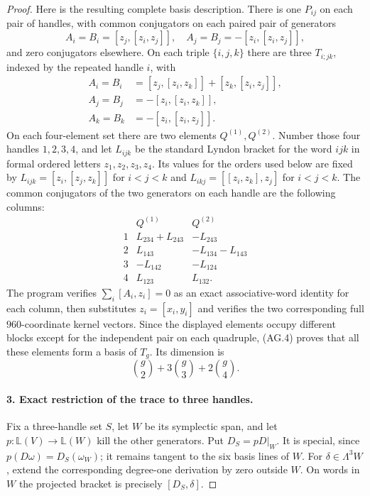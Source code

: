 \begin{proof}
Here is the resulting complete basis description.
There is one $P_{ij}$ on each pair of handles, with
common conjugators on each paired pair of generators
\[
 A_i=B_i=[z_j,[z_i,z_j]],\quad
 A_j=B_j=-[z_i,[z_i,z_j]],
\]
and zero conjugators elsewhere. On each triple
$\{i,j,k\}$ there are three $T_{i;jk}$, indexed
by the repeated handle $i$, with
\[
 \begin{split}
 A_i=B_i&=[z_j,[z_i,z_k]]+[z_k,[z_i,z_j]],\\
 A_j=B_j&=-[z_i,[z_i,z_k]],\\
 A_k=B_k&=-[z_i,[z_i,z_j]].
 \end{split}                                               \tag{AG.5}
\]
On each four-element set there are two elements
$Q^{(1)},Q^{(2)}$. Number those four handles
$1,2,3,4$, and let $L_{ijk}$ be the standard
Lyndon bracket for the word $ijk$ in formal
ordered letters $z_1,z_2,z_3,z_4$. Its values
for the orders used below are fixed by
$L_{ijk}=[z_i,[z_j,z_k]]$ for $i<j<k$ and
$L_{ikj}=[[z_i,z_k],z_j]$ for $i<j<k$.
The common conjugators of the two generators
on each handle are the following columns:
\[
\begin{array}{c|c|c}
 &Q^{(1)}&Q^{(2)}\\\hline
1&L_{234}+L_{243}&-L_{243}\\
2&L_{143}&-L_{134}-L_{143}\\
3&-L_{142}&-L_{124}\\
4&L_{123}&L_{132}.
\end{array}                                               \tag{AG.6}
\]
The program verifies $\sum_i[A_i,z_i]=0$ as an
exact associative-word identity for each column,
then substitutes $z_i=[x_i,y_i]$ and verifies the
two corresponding full $960$-coordinate kernel
vectors. Since the displayed elements occupy
different blocks except for the independent pair
on each quadruple, (AG.4) proves that all these
elements form a basis of $T_g$. Its dimension is
\[
                  \binom{g}{2}+3\binom{g}{3}+2\binom{g}{4}.
                                                               \tag{AG.7}
\]

\paragraph{3. Exact restriction of the trace to three handles.}
Fix a three-handle set $S$, let $W$ be its symplectic
span, and let $p:\mathbb L(V)\to\mathbb L(W)$ kill
the other generators. Put $D_S=pD|_W$.
It is special, since $p(D\omega)=D_S(\omega_W)$;
it remains tangent to the six basis lines of $W$.
For $\delta\in\Lambda^3W$, extend the corresponding
degree-one derivation by zero outside $W$.
On words in $W$ the projected bracket is precisely
$[D_S,\delta]$.


\end{proof}
